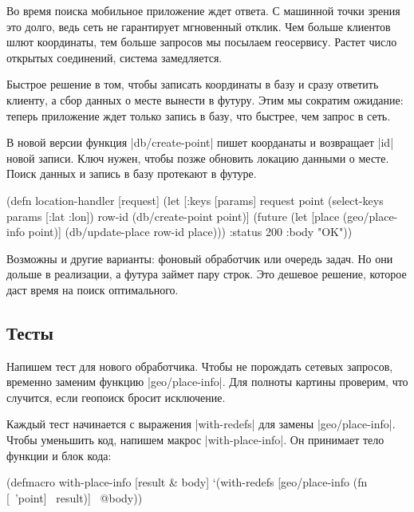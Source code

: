 Во время поиска мобильное приложение ждет ответа. С машинной точки зрения это
долго, ведь сеть не гарантирует мгновенный отклик. Чем больше клиентов шлют
координаты, тем больше запросов мы посылаем геосервису. Растет число
открытых соединений, система замедляется.


Быстрое решение в том, чтобы записать координаты в базу и сразу ответить
клиенту, а сбор данных о месте вынести в футуру. Этим мы сократим ожидание:
теперь приложение ждет только запись в базу, что быстрее, чем запрос в сеть.

В новой версии функция \spverb|db/create-point| пишет коорданаты и возвращает
\spverb|id| новой записи. Ключ нужен, чтобы позже обновить локацию данными о
месте. Поиск данных и запись в базу протекают в футуре.

\begin{english}
  \begin{clojure}
(defn location-handler
  [request]
  (let [{:keys [params]} request
        point (select-keys params [:lat :lon])
        row-id (db/create-point point)]
    (future
      (let [place (geo/place-info point)]
        (db/update-place row-id place)))
    {:status 200 :body "OK"}))
  \end{clojure}
\end{english}

Возможны и другие варианты: фоновый обработчик или очередь задач. Но они дольше
в реализации, а футура займет пару строк. Это дешевое решение, которое даст
время на поиск оптимального.

\subsection{Тесты}


Напишем тест для нового обработчика. Чтобы не порождать сетевых запросов,
временно заменим функцию \spverb|geo/place-info|. Для полноты картины проверим,
что случится, если геопоиск бросит исключение.

Каждый тест начинается с выражения \spverb|with-redefs| для замены
\spverb|geo/place-info|. Чтобы уменьшить код, напишем макрос
\spverb|with-place-info|. Он принимает тело функции и блок кода:

\begin{english}
  \begin{clojure}
(defmacro with-place-info
  [result & body]
  `(with-redefs [geo/place-info
                 (fn [~'point] ~result)]
     ~@body))
  \end{clojure}
\end{english}

